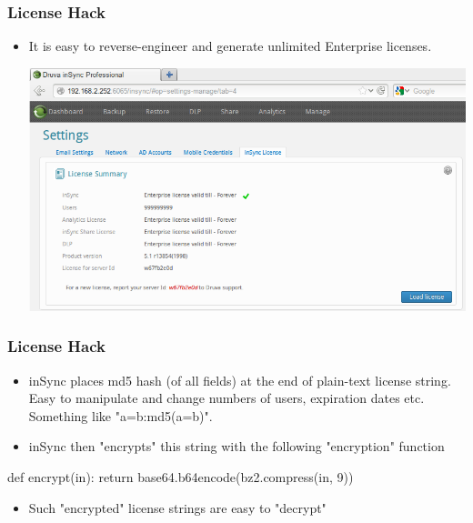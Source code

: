 \documentclass{beamer}
\begin{document}
\begin{frame}
	\frametitle{License Hack}
	\begin{itemize}
		\item It is easy to reverse-engineer and generate unlimited
		Enterprise licenses.
		\begin{center}
			\includegraphics[scale=0.46]{license-hack}
		\end{center}
	\end{itemize}
\end{frame}

\begin{frame}[fragile]
	\frametitle{License Hack}
	\begin{itemize}
		\item inSync places md5 hash (of all fields) at the end of plain-text
		license string. Easy to manipulate and change numbers of users,
		expiration dates etc. Something like "a=b:md5(a=b)".
		\item inSync then "encrypts" this string with the following "encryption" function
	\end{itemize}

	\begin{center}
		\begin{python}
			def encrypt(in):
			return base64.b64encode(bz2.compress(in, 9))
		\end{python}
	\end{center}

	\begin{itemize}
		\item Such "encrypted" license strings are easy to "decrypt"
	\end{itemize}
\end{frame}
\end{document}
